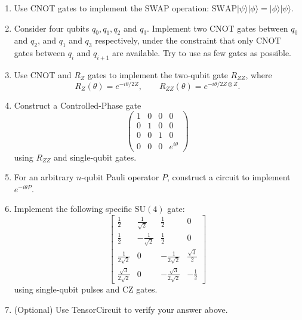 \documentclass{ctexart}
\newcommand{\ket}[1]{|#1\rangle}
\begin{document}
\begin{enumerate}
    \item[(a)] Use CNOT gates to implement the SWAP operation: $\text{SWAP}\ket{\psi}\ket{\phi} = \ket{\phi}\ket{\psi}$.
    \item[(b)] Consider four qubits $q_0, q_1, q_2$ and $q_3$. Implement two CNOT gates between $q_0$ and $q_2$, and $q_1$ and $q_3$ respectively, under the constraint that only CNOT gates between $q_i$ and $q_{i+1}$ are available. Try to use as few gates as possible.
    \item[(c)] Use CNOT and $R_Z$ gates to implement the two-qubit gate $R_{ZZ}$, where
    \begin{equation*}
        R_Z(\theta) = e^{-i\theta/2 Z}, \qquad R_{ZZ}(\theta) = e^{-i\theta/2 Z\otimes Z}.
    \end{equation*}
    \item[(d)] Construct a Controlled-Phase gate
    \begin{equation*}
        \begin{pmatrix}
            1 & 0 & 0 & 0 \\
            0 & 1 & 0 & 0 \\
            0 & 0 & 1 & 0 \\
            0 & 0 & 0 & e^{i\theta}
        \end{pmatrix}
    \end{equation*}
    using $R_{ZZ}$ and single-qubit gates.
    \item[(e)] For an arbitrary $n$-qubit Pauli operator $P$, construct a circuit to implement $e^{-i\theta P}$.
    \item[(f)] Implement the following specific $\mathrm{SU}(4)$ gate:
    \begin{equation*}
        \begin{bmatrix}
            \frac{1}{2} & \frac{1}{\sqrt{2}} & \frac{1}{2} & 0 \\[6pt]
            \frac{1}{2} & -\frac{1}{\sqrt{2}} & \frac{1}{2} & 0 \\[6pt]
            \frac{1}{2\sqrt{2}} & 0 & -\frac{1}{2\sqrt{2}} & \frac{\sqrt{3}}{2} \\[6pt]
            \frac{\sqrt{3}}{2\sqrt{2}} & 0 & -\frac{\sqrt{3}}{2\sqrt{2}} & -\frac{1}{2}
        \end{bmatrix}
    \end{equation*}
    using single-qubit pulses and CZ gates.
    \item[(g)] (Optional) Use TensorCircuit to verify your answer above.
\end{enumerate}
\end{document}
